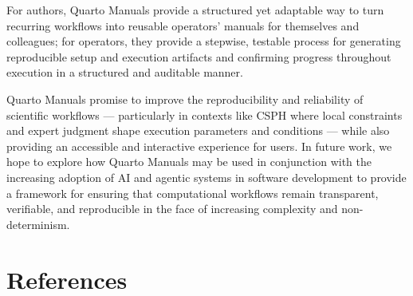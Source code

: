 \documentclass[
  man,
  floatsintext,
  longtable,
  nolmodern,
  notxfonts,
  notimes,
  12pt,
  colorlinks=true,linkcolor=blue,citecolor=blue,urlcolor=blue]{apa7}
\begin{document}
For authors, Quarto Manuals provide a structured yet adaptable way to
turn recurring workflows into reusable operators' manuals for themselves
and colleagues; for operators, they provide a stepwise, testable process
for generating reproducible setup and execution artifacts and confirming
progress throughout execution in a structured and auditable manner.

Quarto Manuals promise to improve the reproducibility and reliability of
scientific workflows --- particularly in contexts like CSPH where local
constraints and expert judgment shape execution parameters and
conditions --- while also providing an accessible and interactive
experience for users. In future work, we hope to explore how Quarto
Manuals may be used in conjunction with the increasing adoption of AI
and agentic systems in software development to provide a framework for
ensuring that computational workflows remain transparent, verifiable,
and reproducible in the face of increasing complexity and
non-determinism.

\section{References}\label{references}
\end{document}
